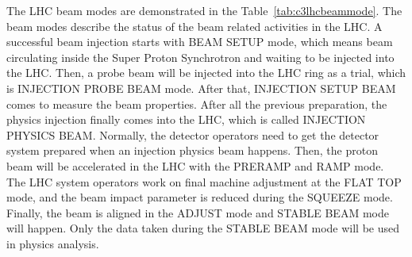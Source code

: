 \par The LHC beam modes are demonstrated in the Table~\ref{tab:c3lhcbeammode}. The beam modes describe the status of the beam related activities in the LHC. A successful beam injection starts with BEAM SETUP mode, which means beam circulating inside the Super Proton Synchrotron and waiting to be injected into the LHC. Then, a probe beam will be injected into the LHC ring as a trial, which is INJECTION PROBE BEAM mode. After that, INJECTION SETUP BEAM comes to measure the beam properties. After all the previous preparation, the physics injection finally comes into the LHC, which is called INJECTION PHYSICS BEAM. Normally, the detector operators need to get the detector system prepared when an injection physics beam happens. Then, the proton beam will be accelerated in the LHC with the PRERAMP and RAMP mode. The LHC system operators work on final machine adjustment at the FLAT TOP mode, and the beam impact parameter is reduced during the SQUEEZE mode. Finally, the beam is aligned in the ADJUST mode and STABLE BEAM mode will happen. Only the data taken during the STABLE BEAM mode will be used in physics analysis.

